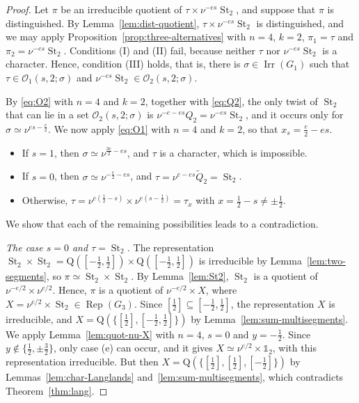 \documentclass[11pt]{amsart}
\numberwithin{equation}{section}
\theoremstyle{plain}
\theoremstyle{definition}
\theoremstyle{remark}
\newcommand{\one}{\mathds{1}}
\DeclareMathOperator{\Irr}{Irr}
\DeclareMathOperator{\Rep}{Rep}
\DeclareMathOperator{\St}{St}
\newcommand{\Qt}{\widetilde{Q}}
\newcommand{\Qq}{\mathrm{Q}}
\begin{document}
\begin{proof}
	Let $\pi$ be an irreducible quotient of $\tau\times\nu^{-es}\St_2$, and suppose that $\pi$ is distinguished. By Lemma~\ref{lem:dist-quotient}, $\tau\times\nu^{-es}\St_2$ is distinguished, and we may apply Proposition~\ref{prop:three-alternatives} with $n=4$, $k=2$, $\pi_1=\tau$ and $\pi_2=\nu^{-es}\St_2$. Conditions (I) and (II) fail, because neither $\tau$ nor $\nu^{-es}\St_2$ is a character. Hence, condition (III) holds, that is, there is $\sigma\in\Irr(G_1)$ such that $\tau\in\mathcal O_1(s,2;\sigma)$ and $\nu^{-es}\St_2\in\mathcal O_2(s,2;\sigma)$.
	
	By \eqref{eq:O2} with $n=4$ and $k=2$, together with \eqref{eq:Q2}, the only twist of $\St_2$ that can lie in a set $\mathcal O_2(s,2;\sigma)$ is $\nu^{-e-es}Q_2=\nu^{-es}\St_2$, and it occurs only for $\sigma\simeq\nu^{es-\frac e2}$. We now apply \eqref{eq:O1} with $n=4$ and $k=2$, so that $x_s=\frac e2-es$.
	\begin{itemize}
		\item If $s=1$, then $\sigma\simeq\nu^{\frac{3e}2-es}$, and $\tau$ is a character, which is impossible.
		\item If $s=0$, then $\sigma\simeq\nu^{-\frac e2-es}$, and $\tau=\nu^{e-es}\Qt_2=\St_2$.
		\item Otherwise, $\tau=\nu^{e(\frac12-s)}\times\nu^{e(s-\frac12)}=\tau_x$ with $x=\frac12-s\ne\pm\frac12$.
	\end{itemize}
	We show that each of the remaining possibilities leads to a contradiction.
	
	\emph{The case $s=0$ and $\tau=\St_2$.} The representation $\St_2\times\St_2=\Qq([-\frac12,\frac12])\times\Qq([-\frac12,\frac12])$ is irreducible by Lemma~\ref{lem:two-segments}, so $\pi\simeq\St_2\times\St_2$. By Lemma~\ref{lem:St2}, $\St_2$ is a quotient of $\nu^{-e/2}\times\nu^{e/2}$. Hence, $\pi$ is a quotient of $\nu^{-e/2}\times X$, where $X=\nu^{e/2}\times\St_2\in\Rep(G_3)$. Since $[\frac12]\subseteq[-\frac12,\frac12]$, the representation $X$ is irreducible, and $X=\Qq(\{[\frac12],[-\frac12,\frac12]\})$ by Lemma~\ref{lem:sum-multisegments}. We apply Lemma~\ref{lem:quot-nu-X} with $n=4$, $s=0$ and $y=-\frac12$. Since $y\notin\{\frac12,\pm\frac32\}$, only case (e) can occur, and it gives $X\simeq\nu^{e/2}\times\one_2$, with this representation irreducible. But then $X=\Qq(\{[\frac12],[\frac12],[-\frac12]\})$ by Lemmas~\ref{lem:char-Langlands} and~\ref{lem:sum-multisegments}, which contradicts Theorem~\ref{thm:lang}.
	

\end{proof}
\end{document}
